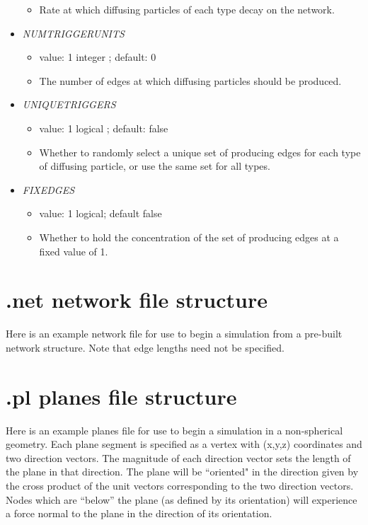 \documentclass[12pt]{article}
\begin{document}
\begin{itemize}
\begin{itemize}
    \item Rate at which diffusing particles of each type decay on the network.
  \end{itemize}
%
\item {\it NUMTRIGGERUNITS}
  \begin{itemize}
    \item  value: 1 integer ; default: $0$
    \item The number of edges at which diffusing particles should be produced.
  \end{itemize}
%
\item {\it UNIQUETRIGGERS}
  \begin{itemize}
    \item  value: 1 logical ; default: false
    \item Whether to randomly select a unique set of producing edges for each type of diffusing particle, or use the same set for all types.
  \end{itemize}
%
\item {\it FIXEDGES}
  \begin{itemize}
    \item  value: 1 logical; default false
    \item Whether to hold the concentration of the set of producing edges at a fixed value of 1.
  \end{itemize}

\end{itemize}


\section{.net network file structure}
\label{sec:netfile}
Here is an example network file for use to begin a simulation from a pre-built network structure. Note that edge lengths need not be specified.

\section{.pl planes file structure}
\label{sec:planefile}
Here is an example planes file for use to begin a simulation in a non-spherical geometry. Each plane segment is specified as a vertex with (x,y,z) coordinates and two direction vectors. The magnitude of each direction vector sets the length of the plane in that direction. The plane will be ``oriented" in the direction given by the cross product of the unit vectors corresponding to the two direction vectors. Nodes which are ``below'' the plane (as defined by its orientation) will experience a force normal to the plane in the direction of its orientation.
\end{document}
